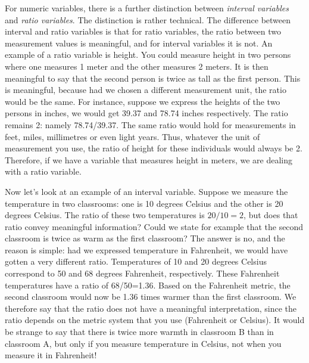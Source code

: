 For numeric variables, there is a further distinction between \textit{interval variables} and \textit{ratio variables}. The distinction is rather technical. The difference between interval and ratio variables is that for ratio variables, the ratio between two measurement values is meaningful, and for interval variables it is not. An example of a ratio variable is height. You could measure height in two persons where one measures 1 meter and the other measures 2 meters. It is then meaningful to say that the second person is twice as tall as the first person. This is meaningful, because had we chosen a different measurement unit, the ratio would be the same. For instance, suppose we express the heights of the two persons in inches, we would get 39.37 and 78.74 inches respectively. The ratio remains 2: namely 78.74/39.37. The same ratio would hold for measurements in feet, miles, millimetres or even light years. Thus, whatever the unit of measurement you use, the ratio of height for these individuals would always be 2. Therefore, if we have a variable that measures height in meters, we are dealing with a ratio variable. 




% 



Now let's look at an example of an interval variable. Suppose we measure the temperature in two classrooms: one is 10 degrees Celsius and the other is 20 degrees Celsius. The ratio of these two temperatures is $20/10=2$, but does that ratio convey meaningful information? Could we state for example that the second classroom is twice as warm as the first classroom? The answer is no, and the reason is simple: had we expressed temperature in Fahrenheit, we would have gotten a very different ratio. Temperatures of 10 and 20 degrees Celsius correspond to 50 and 68 degrees Fahrenheit, respectively. These Fahrenheit temperatures have a ratio of 68/50=1.36. Based on the Fahrenheit metric, the second classroom would now be 1.36 times warmer than the first classroom. We therefore say that the ratio does not have a meaningful interpretation, since the ratio depends on the metric system that you use (Fahrenheit or Celsius). It would be strange to say that there is twice more warmth in classroom B than in classroom A, but only if you measure temperature in Celsius, not when you measure it in Fahrenheit!

